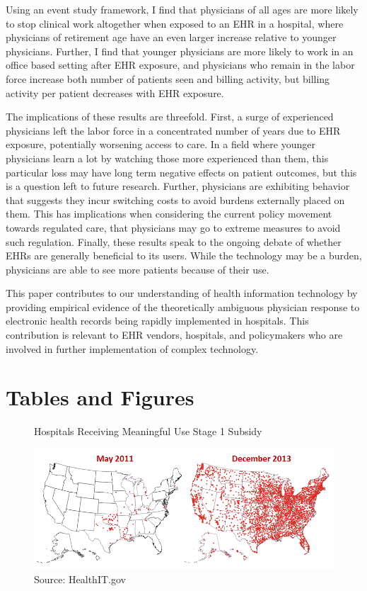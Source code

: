 \documentclass[11pt]{article}
\begin{document}
Using an event study framework, I find that physicians of all ages are more likely to stop clinical work altogether when exposed to an EHR in a hospital, where physicians of retirement age have an even larger increase relative to younger physicians. Further, I find that younger physicians are more likely to work in an office based setting after EHR exposure, and physicians who remain in the labor force increase both number of patients seen and billing activity, but billing activity per patient decreases with EHR exposure. 

The implications of these results are threefold. First, a surge of experienced physicians left the labor force in a concentrated number of years due to EHR exposure, potentially worsening access to care. In a field where younger physicians learn a lot by watching those more experienced than them, this particular loss may have long term negative effects on patient outcomes, but this is a question left to future research. Further, physicians are exhibiting behavior that suggests they incur switching costs to avoid burdens externally placed on them. This has implications when considering the current policy movement towards regulated care, that physicians may go to extreme measures to avoid such regulation. Finally, these results speak to the ongoing debate of whether EHRs are generally beneficial to its users. While the technology may be a burden, physicians are able to see more patients because of their use. 

This paper contributes to our understanding of health information technology by providing empirical evidence of the theoretically ambiguous physician response to electronic health records being rapidly implemented in hospitals. This contribution is relevant to EHR vendors, hospitals, and policymakers who are involved in further implementation of complex technology. 



\section{Tables and Figures}

\begin{figure}[htp]
    \centering
    \caption{Hospitals Receiving Meaningful Use Stage 1 Subsidy}
    \includegraphics[scale=.6]{Objects/QS-Hospitals-Receiving-Payments-for-MU-and-Adoption.png}
    \caption*{Source: HealthIT.gov}
    \label{fig:meanuse}
\end{figure}
\end{document}
